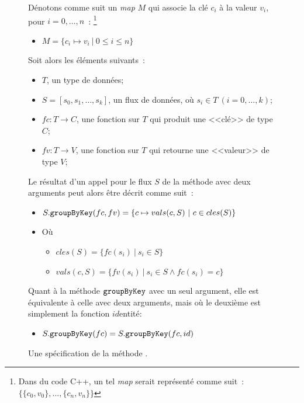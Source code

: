 \begin{figure}
\begin{framed}

D\'enotons comme suit un \emph{map} $M$ qui associe la cl\'e $c_i$ \`a
la valeur $v_i$, pour $i=0, \ldots, n$~:%
%
\footnote{Dans du code C++, un tel \emph{map} serait repr\'esent\'e
comme suit~: $\{\{c_0, v_0\}, \ldots, \{c_n, v_n\}\}$}
%
\begin{itemize}
\item $M = \{ c_i \mapsto v_i~\vert~0 \leq i \leq n \}$
\end{itemize}

Soit alors les \'el\'ements suivants~: 
\begin{itemize}
\item $T$, un type de donn\'ees;

\item $S = [s_0, s_1, \ldots, s_k]$, un flux de donn\'ees, o\`u $s_i
\in T~(i=0, \ldots, k)$;

\item $fc: T \rightarrow C$, une fonction sur  $T$ qui produit une
<<cl\'e>> de type $C$;

\item $fv: T \rightarrow V$, une fonction sur $T$ qui retourne une
<<valeur>> de type $V$;


\end{itemize}


Le r\'esultat d'un appel pour le flux $S$ de la m\'ethode
 avec deux arguments peut alors \^etre d\'ecrit comme
suit~:
%
\begin{itemize}
\item $S.{\tt groupByKey}(fc, fv) = \{ c \mapsto vals(c, S)~\vert~c \in
cles(S)\}$

\item[] O\`u
\begin{itemize}
\item $cles(S) = \{ fc(s_i)~\vert~s_i \in S \}$
\item $vals(c, S) = \{ fv(s_i)~\vert~ s_i\in S \wedge fc(s_i) = c\}$
\end{itemize}

\end{itemize}


\bigskip


Quant \`a la m\'ethode ${\tt groupByKey}$ avec un seul argument, elle est
\'equivalente \`a celle avec deux arguments, mais o\`u le deuxi\`eme est simplement la fonction $id$entit\'e:
%
\begin{itemize}
\item $S.{\tt groupByKey}(fc) = S.{\tt groupByKey}(fc, id)$
\end{itemize}
\end{framed}

\caption{Une sp\'ecification de la m\'ethode .}
\label{group-by-key-spec.fig}
\end{figure}




